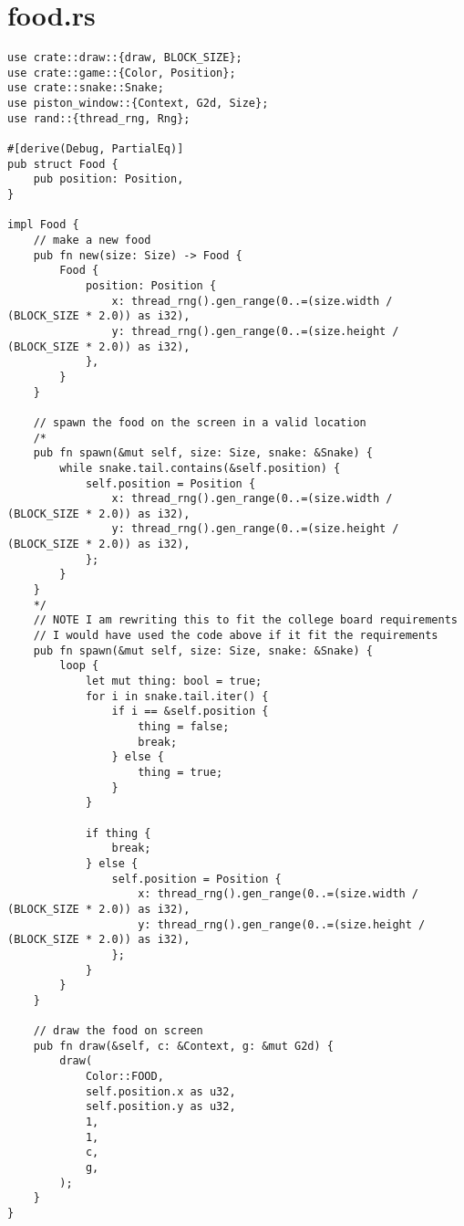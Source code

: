 \documentclass{article}
\begin{document}
\section{food.rs}
\begin{verbatim}
use crate::draw::{draw, BLOCK_SIZE};
use crate::game::{Color, Position};
use crate::snake::Snake;
use piston_window::{Context, G2d, Size};
use rand::{thread_rng, Rng};

#[derive(Debug, PartialEq)]
pub struct Food {
    pub position: Position,
}

impl Food {
    // make a new food
    pub fn new(size: Size) -> Food {
        Food {
            position: Position {
                x: thread_rng().gen_range(0..=(size.width / (BLOCK_SIZE * 2.0)) as i32),
                y: thread_rng().gen_range(0..=(size.height / (BLOCK_SIZE * 2.0)) as i32),
            },
        }
    }

    // spawn the food on the screen in a valid location
    /*
    pub fn spawn(&mut self, size: Size, snake: &Snake) {
        while snake.tail.contains(&self.position) {
            self.position = Position {
                x: thread_rng().gen_range(0..=(size.width / (BLOCK_SIZE * 2.0)) as i32),
                y: thread_rng().gen_range(0..=(size.height / (BLOCK_SIZE * 2.0)) as i32),
            };
        }
    }
    */
    // NOTE I am rewriting this to fit the college board requirements
    // I would have used the code above if it fit the requirements
    pub fn spawn(&mut self, size: Size, snake: &Snake) {
        loop {
            let mut thing: bool = true;
            for i in snake.tail.iter() {
                if i == &self.position {
                    thing = false;
                    break;
                } else {
                    thing = true;
                }
            }

            if thing {
                break;
            } else {
                self.position = Position {
                    x: thread_rng().gen_range(0..=(size.width / (BLOCK_SIZE * 2.0)) as i32),
                    y: thread_rng().gen_range(0..=(size.height / (BLOCK_SIZE * 2.0)) as i32),
                };
            }
        }
    }

    // draw the food on screen
    pub fn draw(&self, c: &Context, g: &mut G2d) {
        draw(
            Color::FOOD,
            self.position.x as u32,
            self.position.y as u32,
            1,
            1,
            c,
            g,
        );
    }
}
\end{verbatim}
\end{document}

